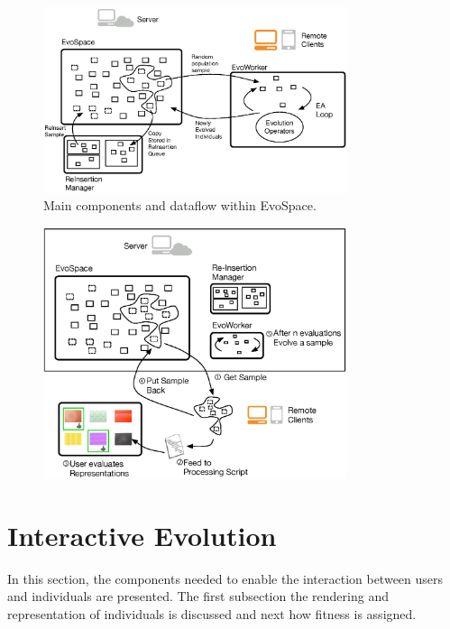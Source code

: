 \documentclass{sig-alternate}
\begin{document}
\begin{figure}[!t]
    \centering
        \includegraphics[width=3.5in]{evospaceExample.eps}
    \caption{Main components and dataflow within EvoSpace.}
    \label{fig:evo}
\end{figure}



\begin{figure}[!t]
    \centering
        \includegraphics[width=3.5in]{evospaceInteractive.eps}
    \caption{}
    \label{fig:evoInteractive}
\end{figure}


\section{Interactive Evolution}
In this section, the components needed to enable the interaction between users and individuals are presented. The first subsection the rendering and representation of individuals is discussed and next how fitness is assigned.
\end{document}
